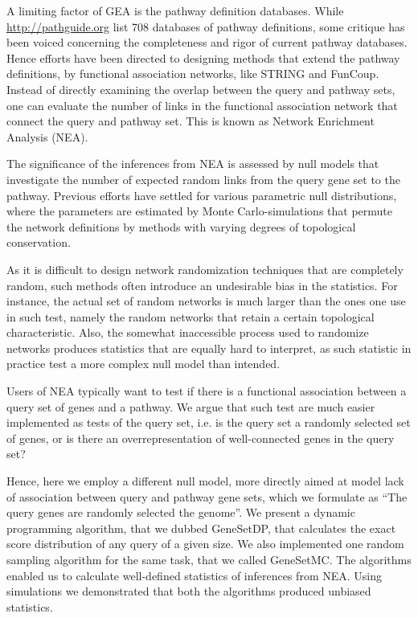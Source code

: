 \documentclass[a4paper,american]{lipics-v2016}
\begin{document}
A limiting factor of GEA is the pathway definition databases. While \url{http://pathguide.org} list 708 databases of pathway definitions\cite{bader2006pathguide},  some critique has been voiced concerning the completeness and rigor of current pathway databases. Hence efforts have been directed to designing methods that extend the pathway definitions, by functional association networks, like STRING\cite{szklarczyk2014string} and FunCoup\cite{ogris2017funcoup}. Instead of directly examining the overlap between the query and pathway sets, one can evaluate the number of links in the functional association network that connect the query and pathway set\cite{alexeyenko2012network, glaab2012enrichnet, mccormack2013statistical, ogris2016novel, signorelli2016neat}. This is known as Network Enrichment Analysis (NEA).

The significance of the inferences from NEA is assessed by null models that investigate the number of expected random links from the query gene set to the pathway. Previous efforts have settled for various parametric null distributions, where the parameters are estimated by Monte Carlo-simulations that permute the network definitions by methods with varying degrees of topological conservation.

As it is difficult to design network randomization techniques that are completely random, such methods often introduce an undesirable bias in the statistics. For instance, the actual set of random networks is much larger than the ones one use in such test, namely the random networks that retain a certain topological characteristic\cite{newman2001random}. Also, the somewhat inaccessible process used to randomize networks produces statistics that are equally hard to interpret, as such statistic in practice test a more complex null model than intended.

Users of NEA typically want to test if there is a functional association between a query set of genes and a pathway\cite{alexeyenko2012network}. We argue that such test are much easier implemented as tests of the query set, i.e. is the query set a randomly selected set of genes, or is there an overrepresentation of well-connected genes in the query set?

Hence, here we employ a different null model, more directly aimed at model lack of association between query and pathway gene sets, which we formulate as ``The query genes are randomly selected the genome''. We present a dynamic programming algorithm, that we dubbed GeneSetDP, that calculates the exact score distribution of any query of a given size. We also implemented one random sampling algorithm for the same task, that we called GeneSetMC.
The algorithms enabled us to calculate well-defined statistics of inferences from NEA.  Using simulations we demonstrated that both the algorithms produced unbiased statistics.
\end{document}
